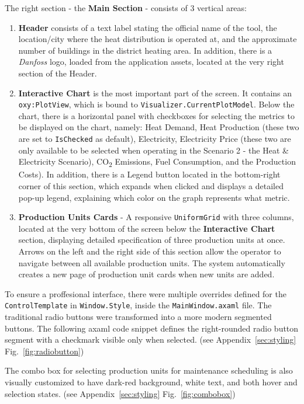 The right section - the \textbf{Main Section} - consists of 3 vertical areas:
\begin{enumerate}
    \item \textbf{Header} consists of a text label stating the official name of the tool, the location/city where the heat distribution is operated at, and the approximate number of buildings in the
    district heating area. In addition, there is a \textit{Danfoss} logo, loaded from the application assets, located at the very right section of the Header.
    \item \textbf{Interactive Chart} is the most important part of the screen. It contains an \texttt{oxy:PlotView}, which is bound to \texttt{Visualizer.CurrentPlotModel}. Below the chart, there is a horizontal panel with checkboxes for selecting the metrics to be displayed on the chart, namely: Heat Demand, Heat Production (these two are set to \texttt{IsChecked} as default), Electricity, Electricity Price (these two are only available to be selected when operating in the Scenario 2 - the Heat \& Electricity Scenario), CO\textsubscript{2} Emissions, Fuel Consumption, and the Production Costs). In addition, there is a Legend button located in the bottom-right corner of this section, which expands when clicked and displays a detailed pop-up legend, explaining which color on the graph represents what metric.
    \item \textbf{Production Units Cards} - A responsive \texttt{UniformGrid} with three columns, located at the very bottom of the screen below the \textbf{Interactive Chart} section, displaying detailed specification of three production units at once. Arrows on the left and the right side of this section allow the operator to navigate between all available production units. The system automatically creates a new page of production unit cards when new units are added.
\end{enumerate}

To ensure a proffesional interface, there were multiple overrides defined for the \texttt{ControlTemplate} in \texttt{Window.Style}, inside the \texttt{MainWindow.axaml} file. The traditional radio buttons were transformed into a more modern segmented buttons. The following \acrshort{axaml} code snippet defines the right-rounded radio button segment with a checkmark visible only when selected. (see Appendix~\ref{sec:styling}  Fig.~\ref{fig:radiobutton})

The combo box for selecting production units for maintenance scheduling is also visually customized to have dark-red background, white text, and both hover and selection states.
(see Appendix~\ref{sec:styling}  Fig.~\ref{fig:combobox})

